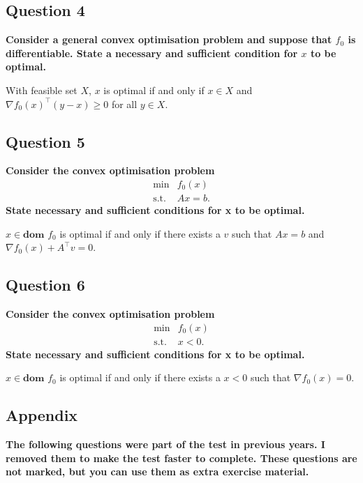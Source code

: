 \subsection*{Question 4}
\textbf{Consider a general convex optimisation problem and suppose that $f_0$ is diﬀerentiable. State a necessary and suﬃcient condition for $x$ to be optimal.}

With feasible set $X$, $x$ is optimal if and only if $x\in X$ and $\nabla f_0(x)^\top (y-x) \ge 0$ for all $y\in X$. 

\subsection*{Question 5}
\textbf{Consider the convex optimisation problem
$$
\begin{array}{lll}
\text{min} & f_0(x) \\
\text{s.t.} & Ax = b.
\end{array}
$$
State necessary and suﬃcient conditions for x to be optimal.}

$x\in\textbf{dom }f_0$ is optimal if and only if there exists a $v$ such that $Ax = b$ and $\nabla f_0(x) + A^\top v =0$. 


\subsection*{Question 6}
\textbf{Consider the convex optimisation problem
$$ 
\begin{array}{lll}
\text{min} & f_0(x) \\
\text{s.t.} & x < 0. 
\end{array}
$$
State necessary and suﬃcient conditions for x to be optimal.}

$x\in\textbf{dom }f_0$ is optimal if and only if there exists a $ x < 0$ such that $\nabla f_0 (x)=0$. 

\newpage

\subsection*{Appendix}
\textbf{The following questions were part of the test in previous years. I removed them to make the test faster to complete. These questions are not marked, but you can use them as extra exercise material.}

